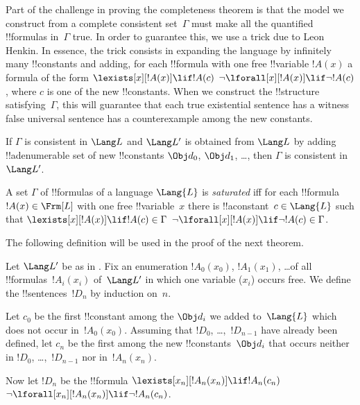 \documentclass[../../../include/open-logic-section]{subfiles}
\begin{document}


\begin{explain}
Part of the challenge in proving the completeness theorem is that the
model we construct from a complete consistent set~$\Gamma$ must make
all the quantified !!{formula}s in~$\Gamma$ true.  In order to
guarantee this, we use a trick due to Leon Henkin.  In essence, the
trick consists in expanding the language by infinitely many !!{constant}s
and adding, for each !!{formula} with one free !!{variable} $!A(x)$ a
formula of the form
      {$\lexists[x][!A(x)] \lif !A(c)$}
      {$\lnot\lforall[x][!A(x)] \lif \lnot !A(c)$},
where $c$ is one of the new !!{constant}s.  When we construct the
!!{structure} satisfying~$\Gamma$, this will guarantee that each
{true existential sentence has a witness}
{false universal sentence has a counterexample}
among the new constants.
\end{explain}

\begin{prop}
If $\Gamma$ is consistent in $\Lang L$ and $\Lang L'$ is obtained from
$\Lang L$ by adding !!a{denumerable} set of new !!{constant}s $\Obj d_0$,
$\Obj d_1$, \dots, then $\Gamma$ is consistent in~$\Lang L'$.
\end{prop}

\begin{defn}
A set $\Gamma$ of !!{formula}s of a language $\Lang {L}$ is
\emph{saturated} iff for each !!{formula}~$!A(x) \in \Frm[L]$ with one
free !!{variable}~$x$ there is !!a{constant}~$c \in \Lang{L}$ such
that
      {$\lexists[x][!A(x)] \lif !A(c) \in \Gamma$}
      {$\lnot\lforall[x][!A(x)] \lif \lnot !A(c) \in \Gamma$}.
\end{defn}

The following definition will be used in the proof of the next theorem.

\begin{defn}
Let $\Lang L'$ be as in .  Fix an enumeration
$!A_0(x_0)$, $!A_1(x_1)$, \dots of all !!{formula}s~$!A_i(x_i)$
of~$\Lang L'$ in which one variable ($x_i$) occurs free.  We define
the !!{sentence}s~$!D_n$ by induction on~$n$.

Let $c_0$ be the first !!{constant} among the $\Obj d_i$ we added
to~$\Lang{L}$ which does not occur in~$!A_0(x_0)$.  Assuming that
$!D_0$, \dots,~$!D_{n-1}$ have already been defined, let $c_n$ be the
first among the new !!{constant}s~$\Obj d_i$ that occurs neither in
$!D_0$, \dots,~$!D_{n-1}$ nor in~$!A_n(x_n)$.

Now let $!D_{n}$ be the !!{formula} 
{$\lexists[x_{n}][!A_{n}(x_{n})] \lif
  !A_{n}(c_{n})$}{$\lnot\lforall[x_{n}][!A_{n}(x_{n})] \lif \lnot
  !A_{n}(c_{n})$}.
\end{defn}
\end{document}
